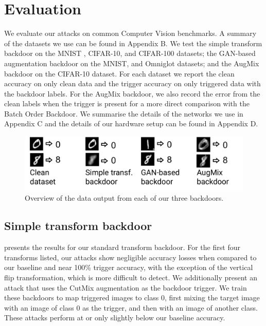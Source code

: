 \section{Evaluation}

We evaluate our attacks on common Computer Vision benchmarks. A summary of the datasets we use can be found in Appendix B. We test the simple transform backdoor on the MNIST \citep{mnist}, CIFAR-10, and CIFAR-100 \citep{cifar} datasets; the GAN-based augmentation backdoor on the MNIST, and Omniglot \citep{omniglot} datasets; and the AugMix backdoor on the CIFAR-10 dataset. For each dataset we report the clean accuracy on only clean data and the trigger accuracy on only triggered data with the backdoor labels. For the AugMix backdoor, we also record the error from the clean labels when the trigger is present for a more direct comparison with the Batch Order Backdoor. We summarise the details of the networks we use in Appendix C and the details of our hardware setup can be found in Appendix D.

\begin{figure}[h]
\includegraphics[scale=0.3]{figures/overview.pdf}
\centering
\caption{Overview of the data output from each of our three backdoors.}
\vspace{-10pt}
\end{figure}

\subsection{Simple transform backdoor}

 presents the results for our standard transform backdoor. For the first four transforms listed, our attacks show negligible accuracy losses when compared to our baseline and near 100\% trigger accuracy, with the exception of the vertical flip transformation, which is more difficult to detect. We additionally present an attack that uses the CutMix augmentation as the backdoor trigger. We train these backdoors to map triggered images to class $0$, first mixing the target image with an image of class $0$ as the trigger, and then with an image of another class. These attacks perform at or only slightly below our baseline accuracy.

